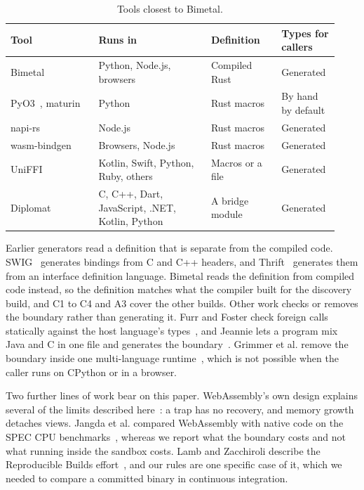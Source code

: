 \documentclass[sigconf,nonacm]{acmart}
\begin{document}
\begin{table}[t]
\caption{Tools closest to Bimetal.}
\label{tab:related}
\footnotesize
\setlength{\tabcolsep}{3pt}
\begin{tabular}{@{}p{0.25\linewidth}p{0.32\linewidth}p{0.2\linewidth}p{0.16\linewidth}@{}}
\toprule
Tool & Runs in & Definition & Types for callers \\
\midrule
Bimetal & Python, Node.js, browsers & Compiled Rust & Generated \\
PyO3~\cite{pyo3}, maturin~\cite{maturin} & Python & Rust macros & By hand by default \\
napi-rs~\cite{napirs} & Node.js & Rust macros & Generated \\
wasm-bindgen~\cite{wasmbindgen} & Browsers, Node.js & Rust macros & Generated \\
UniFFI~\cite{uniffi} & Kotlin, Swift, Python, Ruby, others & Macros or a file & Generated \\
Diplomat~\cite{diplomat} & C, C++, Dart, JavaScript, .NET, Kotlin, Python & A bridge module & Generated \\
\bottomrule
\end{tabular}
\end{table}

Earlier generators read a definition that is separate from the compiled code. SWIG~\cite{beazley1996swig} generates bindings from C and C++ headers, and Thrift~\cite{slee2007thrift} generates them from an interface definition language. Bimetal reads the definition from compiled code instead, so the definition matches what the compiler built for the discovery build, and C1 to C4 and A3 cover the other builds. Other work checks or removes the boundary rather than generating it. Furr and Foster check foreign calls statically against the host language's types~\cite{furr2005}, and Jeannie lets a program mix Java and C in one file and generates the boundary~\cite{hirzel2007jeannie}. Grimmer et al. remove the boundary inside one multi-language runtime~\cite{grimmer2015}, which is not possible when the caller runs on CPython or in a browser.

Two further lines of work bear on this paper. WebAssembly's own design explains several of the limits described here~\cite{haas2017wasm}: a trap has no recovery, and memory growth detaches views. Jangda et al. compared WebAssembly with native code on the SPEC CPU benchmarks~\cite{jangda2019notsofast}, whereas we report what the boundary costs and not what running inside the sandbox costs. Lamb and Zacchiroli describe the Reproducible Builds effort~\cite{lamb2022reproducible}, and our rules are one specific case of it, which we needed to compare a committed binary in continuous integration.
\end{document}
